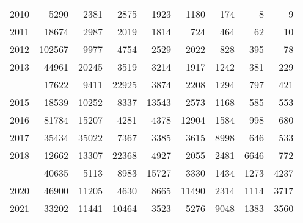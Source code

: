\documentclass[
]{article}
\begin{document}
\begin{longtable}[t]{lrrrrrrrr}
2010 & 5290 & 2381 & 2875 & 1923 & 1180 & 174 & 8 & 9\\
2011 & 18674 & 2987 & 2019 & 1814 & 724 & 464 & 62 & 10\\
2012 & 102567 & 9977 & 4754 & 2529 & 2022 & 828 & 395 & 78\\
2013 & 44961 & 20245 & 3519 & 3214 & 1917 & 1242 & 381 & 229\\
\addlinespace
2014 & 17622 & 9411 & 22925 & 3874 & 2208 & 1294 & 797 & 421\\
2015 & 18539 & 10252 & 8337 & 13543 & 2573 & 1168 & 585 & 553\\
2016 & 81784 & 15207 & 4281 & 4378 & 12904 & 1584 & 998 & 680\\
2017 & 35434 & 35022 & 7367 & 3385 & 3615 & 8998 & 646 & 533\\
2018 & 12662 & 13307 & 22368 & 4927 & 2055 & 2481 & 6646 & 772\\
\addlinespace
2019 & 40635 & 5113 & 8983 & 15727 & 3330 & 1434 & 1273 & 4237\\
2020 & 46900 & 11205 & 4630 & 8665 & 11490 & 2314 & 1114 & 3717\\
2021 & 33202 & 11441 & 10464 & 3523 & 5276 & 9048 & 1383 & 3560\\*
\end{longtable}
\end{document}

